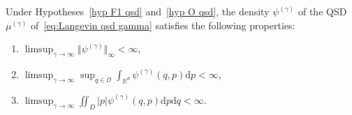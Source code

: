 \documentclass[preprint,EJP]{ejpecp}
\begin{document}
\begin{proposition}\label{properties psi gamma} Under Hypotheses~\ref{hyp F1 qsd} and~\ref{hyp O qsd}, the density $\psi^{(\gamma)}$ of the QSD $\mu^{(\gamma)}$ of~\eqref{eq:Langevin qsd gamma} satisfies the following properties:
\begin{enumerate} 
    \item $ \limsup_{\gamma\rightarrow\infty}\big\Vert\psi^{(\gamma)}\big\Vert_\infty<\infty$, 
    \item $ \limsup_{\gamma\rightarrow\infty}\sup_{q\in\mathcal{O}}\int_{\mathbb{R}^d}\psi^{(\gamma)}(q,p) \mathrm{d}p<\infty$,
    \item $ \limsup_{\gamma\rightarrow\infty}\iint_{D}\vert p\vert \psi^{(\gamma)}(q,p) \mathrm{d}p \mathrm{d}q<\infty$.
\end{enumerate}   
\end{proposition}
  
\end{document}
